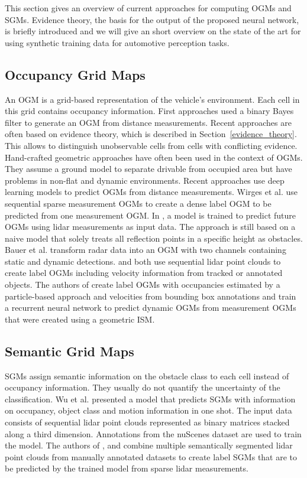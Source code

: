 \documentclass[conference]{IEEEtran}
\begin{document}
This section gives an overview of current approaches for computing OGMs and SGMs. Evidence theory, the basis for the output of the proposed neural network, is briefly introduced and we will give an short overview on the state of the art for using synthetic training data for automotive perception tasks.


\subsection{Occupancy Grid Maps}\label{ogm}

An OGM \cite{Elfes.1989} is a grid-based representation of the vehicle's environment. Each cell in this grid contains occupancy information. First approaches used a binary Bayes filter to generate an OGM from distance measurements. Recent approaches are often based on evidence theory, which is described in Section~\ref{evidence_theory}. This allows to distinguish unobservable cells from cells with conflicting evidence. Hand-crafted geometric approaches have often been used in the context of OGMs. They assume a ground model to separate drivable from occupied area but have problems in non-flat and dynamic environments. Recent approaches use deep learning models to predict OGMs from distance measurements. Wirges et al. \cite{Wirges.2018} use sequential sparse measurement OGMs to create a dense label OGM to be predicted from one measurement OGM. In \cite{Dequaire.2018}, a model is trained to predict future OGMs using lidar measurements as input data. The approach is still based on a naive model that solely treats all reflection points in a specific height as obstacles. Bauer et al. \cite{Bauer.2019b} transform radar data into an OGM with two channels containing static and dynamic detections. \cite{Filatov.2020} and \cite{Lee.03.08.2020} both use sequential lidar point clouds to create label OGMs including velocity information from tracked or annotated objects. The authors of \cite{Schreiber.2021b} create label OGMs with occupancies estimated by a particle-based approach and velocities from bounding box annotations and train a recurrent neural network to predict dynamic OGMs from measurement OGMs that were created using a geometric ISM.


\subsection{Semantic Grid Maps}

SGMs assign semantic information on the obstacle class to each cell instead of occupancy information. They usually do not quantify the uncertainty of the classification. Wu et al. \cite{Wu.2020} presented a model that predicts SGMs with information on occupancy, object class and motion information in one shot. The input data consists of sequential lidar point clouds represented as binary matrices stacked along a third dimension. Annotations from the nuScenes dataset \cite{Caesar.2020} are used to train the model. The authors of \cite{Bieder.2020}, \cite{Shepel.2021} and \cite{Fei.2021b} combine multiple semantically segmented lidar point clouds from manually annotated datasets to create label SGMs that are to be predicted by the trained model from sparse lidar measurements.
\end{document}
